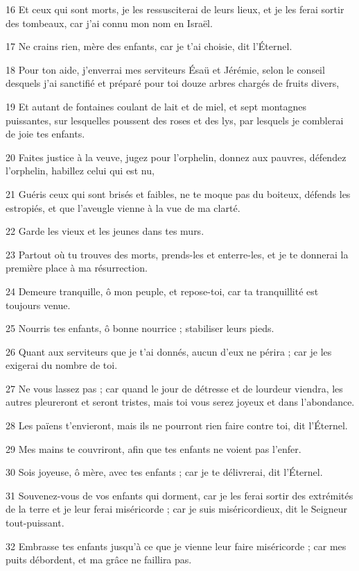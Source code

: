 \par 16 Et ceux qui sont morts, je les ressusciterai de leurs lieux, et je les ferai sortir des tombeaux, car j'ai connu mon nom en Israël.
\par 17 Ne crains rien, mère des enfants, car je t'ai choisie, dit l'Éternel.
\par 18 Pour ton aide, j'enverrai mes serviteurs Ésaü et Jérémie, selon le conseil desquels j'ai sanctifié et préparé pour toi douze arbres chargés de fruits divers,
\par 19 Et autant de fontaines coulant de lait et de miel, et sept montagnes puissantes, sur lesquelles poussent des roses et des lys, par lesquels je comblerai de joie tes enfants.
\par 20 Faites justice à la veuve, jugez pour l'orphelin, donnez aux pauvres, défendez l'orphelin, habillez celui qui est nu,
\par 21 Guéris ceux qui sont brisés et faibles, ne te moque pas du boiteux, défends les estropiés, et que l'aveugle vienne à la vue de ma clarté.
\par 22 Garde les vieux et les jeunes dans tes murs.
\par 23 Partout où tu trouves des morts, prends-les et enterre-les, et je te donnerai la première place à ma résurrection.
\par 24 Demeure tranquille, ô mon peuple, et repose-toi, car ta tranquillité est toujours venue.
\par 25 Nourris tes enfants, ô bonne nourrice ; stabiliser leurs pieds.
\par 26 Quant aux serviteurs que je t'ai donnés, aucun d'eux ne périra ; car je les exigerai du nombre de toi.
\par 27 Ne vous lassez pas ; car quand le jour de détresse et de lourdeur viendra, les autres pleureront et seront tristes, mais toi vous serez joyeux et dans l'abondance.
\par 28 Les païens t'envieront, mais ils ne pourront rien faire contre toi, dit l'Éternel.
\par 29 Mes mains te couvriront, afin que tes enfants ne voient pas l'enfer.
\par 30 Sois joyeuse, ô mère, avec tes enfants ; car je te délivrerai, dit l'Éternel.
\par 31 Souvenez-vous de vos enfants qui dorment, car je les ferai sortir des extrémités de la terre et je leur ferai miséricorde ; car je suis miséricordieux, dit le Seigneur tout-puissant.
\par 32 Embrasse tes enfants jusqu'à ce que je vienne leur faire miséricorde ; car mes puits débordent, et ma grâce ne faillira pas.
